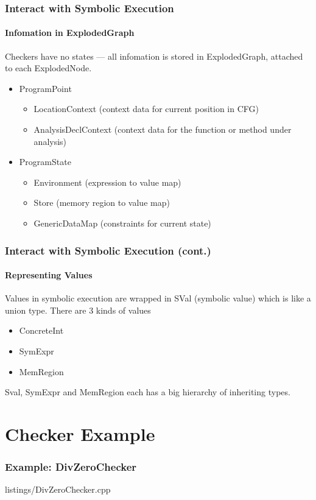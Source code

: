 \documentclass[]{beamer}
\begin{document}
\begin{frame}
  \frametitle{Interact with Symbolic Execution}
  \framesubtitle{Infomation in ExplodedGraph}
  Checkers have no states --- all infomation is stored in ExplodedGraph,
  attached to each ExplodedNode.
  \pause
  \begin{itemize}
    \item ProgramPoint
      \begin{itemize}
        \item LocationContext (context data for current position in CFG)
        \item AnalysisDeclContext (context data for the function
          or method under analysis)
      \end{itemize}
    \item ProgramState
      \begin{itemize}
        \item Environment (expression to value map)
        \item Store (memory region to value map)
        \item GenericDataMap (constraints for current state)
      \end{itemize}
  \end{itemize}
\end{frame}

\begin{frame}
  \frametitle{Interact with Symbolic Execution (cont.)}
  \framesubtitle{Representing Values}
  Values in symbolic execution are wrapped in \alert{SVal} (symbolic
  value) which is like a union type. There are 3 kinds of values
  \pause
  \begin{itemize}
    \item ConcreteInt
    \item SymExpr
    \item MemRegion
  \end{itemize}

  \pause
  Sval, SymExpr and MemRegion each has a big hierarchy of inheriting
  types.
\end{frame}

\section{Checker Example}
\frame{\tableofcontents[currentsection]}

\begin{frame}
  \frametitle{Example: DivZeroChecker}
  
                  {listings/DivZeroChecker.cpp}
\end{frame}
\end{document}
